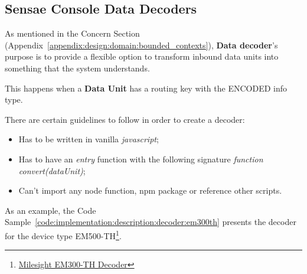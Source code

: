 \subsection{Sensae Console Data Decoders}
\label{subsec:implementation:description:decoder}

As mentioned in the  Concern Section  (Appendix~\ref{appendix:design:domain:bounded_contexts}), \textbf{Data decoder}'s purpose is to provide a flexible option to transform inbound data units into something that the system understands.

This happens when a \textbf{Data Unit} has a routing key with the ENCODED info type.

There are certain guidelines to follow in order to create a decoder:

\begin{itemize}
    \item Has to be written in vanilla \textit{javascript};
    \item Has to have an \textit{entry} function with the following signature \textit{function convert(dataUnit)};
    \item Can't import any node function, npm package or reference other scripts.
\end{itemize}

As an example, the Code Sample~\ref{code:implementation:description:decoder:em300th} presents the decoder for the device type EM500-TH\footnote{\href {https://www.milesight-iot.com/lorawan/sensor/em300-th}{Milesight EM300-TH Decoder}}.

